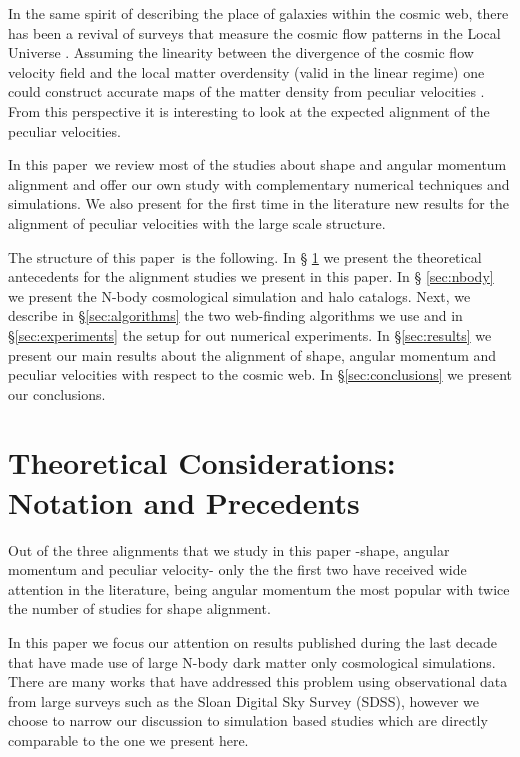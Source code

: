 \documentclass[useAMS,usenatbib]{mn2e}
\newcommand{\documentname}{paper~}
\begin{document}
In the same spirit of describing the place of galaxies within the
cosmic web, there has been a revival of surveys that measure the
cosmic flow patterns in the Local Universe
\citep{Nusser2011,Tully2013}. Assuming the linearity between the
divergence of the cosmic flow velocity field and the local matter
overdensity (valid in the linear regime) one could construct accurate
maps of the matter density from peculiar velocities
\citep{Courtois2012}. From this perspective it is interesting to look
at the expected alignment of the peculiar velocities.

In this \documentname we review most of the studies about shape and
angular momentum alignment and offer our own study with complementary
numerical techniques and simulations.  We also present for the first
time in the literature new results for the alignment of peculiar
velocities with the large scale structure.

The structure of this \documentname is the following. In \S
\ref{sec:theory} we present the theoretical antecedents for the
alignment studies we present in this paper. In \S
\ref{sec:nbody} we present the N-body
cosmological simulation and halo catalogs.  Next, we describe in
\S\ref{sec:algorithms} the two web-finding algorithms we use and in
\S\ref{sec:experiments} the setup for out numerical experiments. In
\S\ref{sec:results} we present our main results about the alignment
of shape, angular momentum and peculiar velocities with respect to the cosmic
web. In \S\ref{sec:conclusions} we present our conclusions.


\section{Theoretical Considerations: Notation and Precedents}
\label{sec:theory}


Out of the three alignments that we study in this paper -shape,
angular momentum and peculiar velocity- only the the first two have
received wide attention in the literature, being angular momentum the
most popular with twice the number of studies for shape alignment.

In this paper we focus our attention on results published during the last
decade that have made use of large N-body dark matter only
cosmological simulations. There are many works that have addressed
this problem using observational data from large surveys such as the
Sloan Digital Sky Survey (SDSS), however we choose to narrow our
discussion to simulation based studies which are %
directly comparable to the one we present here.
\end{document}
